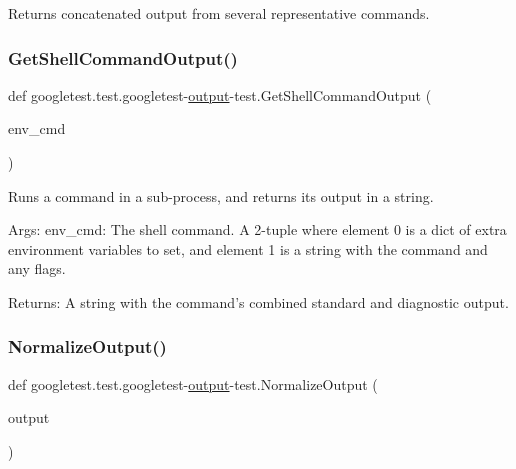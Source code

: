 \begin{DoxyVerb}Returns concatenated output from several representative commands.\end{DoxyVerb}
 \mbox{\label{namespacegoogletest_1_1test_1_1googletest-output-test_aa5a7ea5b9a73e1538841493ed39fcca6}} 
\subsubsection{\texorpdfstring{GetShellCommandOutput()}{GetShellCommandOutput()}}
{\footnotesize\ttfamily def googletest.\+test.\+googletest-\/\mbox{\hyperlink{namespacegoogletest_1_1test_1_1googletest-output-test_a6773c2217ae4694b4db5610620562437}{output}}-\/test.\+Get\+Shell\+Command\+Output (\begin{DoxyParamCaption}\item[{}]{env\+\_\+cmd }\end{DoxyParamCaption})}

\begin{DoxyVerb}Runs a command in a sub-process, and returns its output in a string.

Args:
  env_cmd: The shell command. A 2-tuple where element 0 is a dict of extra
           environment variables to set, and element 1 is a string with
           the command and any flags.

Returns:
  A string with the command's combined standard and diagnostic output.
\end{DoxyVerb}
 \mbox{\label{namespacegoogletest_1_1test_1_1googletest-output-test_a9654817b6fb7fc3acc034ea375b635c8}} 
\subsubsection{\texorpdfstring{NormalizeOutput()}{NormalizeOutput()}}
{\footnotesize\ttfamily def googletest.\+test.\+googletest-\/\mbox{\hyperlink{namespacegoogletest_1_1test_1_1googletest-output-test_a6773c2217ae4694b4db5610620562437}{output}}-\/test.\+Normalize\+Output (\begin{DoxyParamCaption}\item[{}]{output }\end{DoxyParamCaption})}

